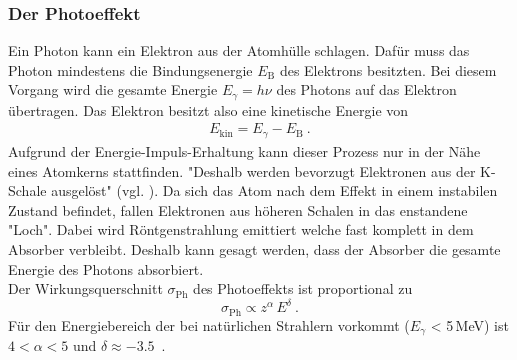 \subsubsection{Der Photoeffekt}
Ein Photon kann ein Elektron aus der Atomhülle schlagen. Dafür muss das Photon mindestens die Bindungsenergie $E_\text{B}$ des Elektrons besitzten. Bei diesem Vorgang wird die gesamte Energie $E_\gamma = h\nu$ des Photons auf das Elektron übertragen. Das Elektron besitzt also eine kinetische Energie von
\begin{align}
	E_\text{kin} = E_\gamma - E_\text{B} \ .
\end{align}
Aufgrund der Energie-Impuls-Erhaltung kann dieser Prozess nur in der Nähe eines Atomkerns stattfinden. "Deshalb werden bevorzugt Elektronen aus der K-Schale ausgelöst" (vgl. \cite[3]{V18}). Da sich das Atom nach dem Effekt in einem instabilen Zustand befindet, fallen Elektronen aus höheren Schalen in das enstandene "Loch". Dabei wird Röntgenstrahlung emittiert welche fast komplett in dem Absorber verbleibt. Deshalb kann gesagt werden, dass der Absorber die gesamte Energie des Photons absorbiert. \\
Der Wirkungsquerschnitt $\sigma_\text{Ph}$ des Photoeffekts ist proportional zu
\begin{equation}
	\sigma_\text{Ph} \propto z^{\alpha}\,E^{\delta} \ .
\end{equation}
Für den Energiebereich der bei natürlichen Strahlern vorkommt ($E_\gamma$ < 5\,MeV) ist $4 < \alpha < 5$ und $\delta \approx -3.5$\ .



